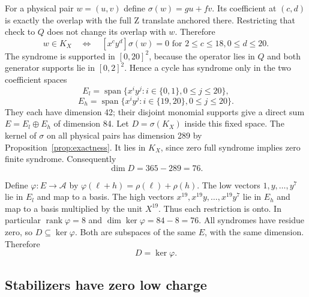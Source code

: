 \documentclass{article}
\DeclareMathOperator{\rank}{rank}
\DeclareMathOperator{\Span}{span}
\begin{document}
For a physical pair \(w = (u, v)\) define \(\sigma(w) = gu + fv\). Its coefficient at
\((c,d)\) is exactly the overlap with the full Z translate anchored there. Restricting that
check to \(Q\) does not change its overlap with \(w\). Therefore
\begin{equation}
  w \in K_X \quad \Longleftrightarrow \quad
  [x^c y^d]\sigma(w) = 0
  \text{ for } 2 \le c \le 18, 0 \le d \le 20.
\end{equation}
The syndrome is supported in \([0,20]^2\), because the operator lies in \(Q\) and both
generator supports lie in \([0,2]^2\). Hence a cycle has syndrome only in the two
coefficient spaces
\begin{equation}
  E_l = \Span\{x^i y^j : i \in \{0,1\}, 0 \le j \le 20\},
\end{equation}
\begin{equation}
  E_h = \Span\{x^i y^j : i \in \{19,20\}, 0 \le j \le 20\}.
\end{equation}
They each have dimension 42; their disjoint monomial supports give a direct sum
\(E = E_l \oplus E_h\) of dimension 84. Let \(D = \sigma(K_X)\) inside this fixed space. The
kernel of \(\sigma\) on all physical pairs has dimension 289 by Proposition~\ref{prop:exactness}.
It lies in \(K_X\), since zero full syndrome implies zero finite syndrome. Consequently
\begin{equation}
  \dim D = 365 - 289 = 76.
\end{equation}

Define \(\varphi \colon E \to \mathcal{A}\) by \(\varphi(\ell + h) = \rho(\ell) + \rho(h)\).
The low vectors \(1, y, \dots, y^7\) lie in \(E_l\) and map to a basis. The high vectors
\(x^{19}, x^{19} y, \dots, x^{19} y^7\) lie in \(E_h\) and map to a basis multiplied by the
unit \(X^{19}\). Thus each restriction is onto. In particular \(\rank \varphi = 8\) and
\(\dim \ker \varphi = 84 - 8 = 76\). All syndromes have residue zero, so
\(D \subseteq \ker \varphi\). Both are subspaces of the same \(E\), with the same dimension.
Therefore
\begin{equation}
  D = \ker \varphi.
\end{equation}

\subsection{Stabilizers have zero low charge}\label{sec:x-stabilizers}
\end{document}
